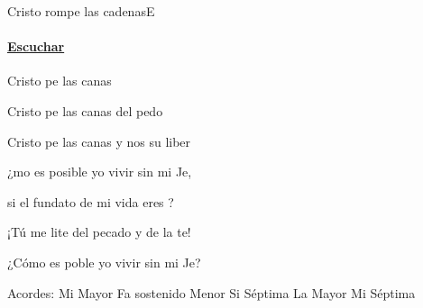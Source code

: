 \documentclass[12pt, spanish]{book}
\newcommand{\NotCCLIed}{\relax}
\begin{document}
    \begin{song}{Cristo rompe las cadenas}{E}
        {} %
        {}
        {} %
        {} %
        \ifChordBk
        \paragraph{\mbox{}\hfill\protect\href{https://open.spotify.com/intl-es/track/5skmp0I9YdDMzQqhWQhf2C}{Escuchar}\mbox{}\hfill}
        \fi

        \begin{SBChorus}
            Cristo pe las canas

            Cristo pe las canas del pedo

            Cristo pe las canas y nos  su liber
        \end{SBChorus}

        \begin{SBOpGroup}
            ¿mo es posible yo vivir sin mi Je,

            si el fundato de mi vida eres ?

            ¡Tú me lite del pecado y de la te!

            ¿Cómo es poble yo vivir sin mi Je?
        \end{SBOpGroup}

        \ifChordBk
        \begin{SBOpGroup}
            Acordes:
            \upchord{\E}\qquad Mi Mayor \hfill
            \upchord{\Fsm}\qquad Fa sostenido Menor \hfill\null\break
            \upchord{\Bseven}\qquad Si S\'eptima \hfill
            \upchord{\A}\qquad La Mayor \hfill\null\break
            \upchord{\Eseven}\qquad Mi S\'eptima \hfill
        \end{SBOpGroup}
        \fi
    \end{song}
\end{document}
